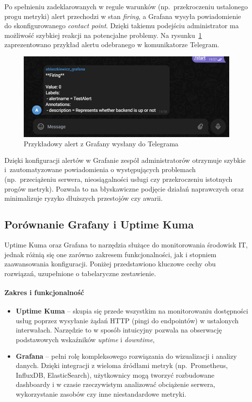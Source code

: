 \documentclass{article}
\begin{document}
Po spełnieniu zadeklarowanych w regule warunków (np.\ przekroczeniu ustalonego progu metryki) alert przechodzi w stan \textit{firing}, a Grafana wysyła powiadomienie do skonfigurowanego \textit{contact point}. Dzięki takiemu podejściu administrator ma możliwość szybkiej reakcji na potencjalne problemy. Na rysunku~\ref{fig:alert-grafana-telegram} zaprezentowano przykład alertu odebranego w komunikatorze Telegram.

\begin{figure}[H] \centering \includegraphics[width=0.9\linewidth]{alertGrafana.png} \caption{Przykładowy alert z Grafany wysłany do Telegrama} \label{fig:alert-grafana-telegram} \end{figure}

Dzięki konfiguracji alertów w Grafanie zespół administratorów otrzymuje szybkie i~zautomatyzowane powiadomienia o występujących problemach (np.\ przeciążeniu serwera, nieosiągalności usługi czy przekroczeniu istotnych progów metryk). Pozwala to na błyskawiczne podjęcie działań naprawczych oraz minimalizuje ryzyko dłuższych przestojów czy awarii.

\subsection{Porównanie Grafany i Uptime Kuma}


Uptime Kuma oraz Grafana to narzędzia służące do monitorowania środowisk IT, jednak różnią się one zarówno zakresem funkcjonalności, jak i stopniem zaawansowania konfiguracji. Poniżej przedstawiono kluczowe cechy obu rozwiązań, uzupełnione o tabelaryczne zestawienie.

\paragraph{Zakres i funkcjonalność}
\begin{itemize}
    \item \textbf{Uptime Kuma} -- skupia się przede wszystkim na monitorowaniu dostępności usług poprzez wysyłanie żądań HTTP (pingi do endpointów) w ustalonych interwałach. Narzędzie to w sposób intuicyjny pozwala na obserwację podstawowych wskaźników \emph{uptime} i \emph{downtime},
    \item \textbf{Grafana} -- pełni rolę kompleksowego rozwiązania do wizualizacji i analizy danych. Dzięki integracji z wieloma źródłami metryk (np.\ Prometheus, InfluxDB, ElasticSearch), użytkownicy mogą tworzyć rozbudowane dashboardy i w czasie rzeczywistym analizować obciążenie serwera, wykorzystanie zasobów czy inne niestandardowe metryki.
\end{itemize}
\end{document}
